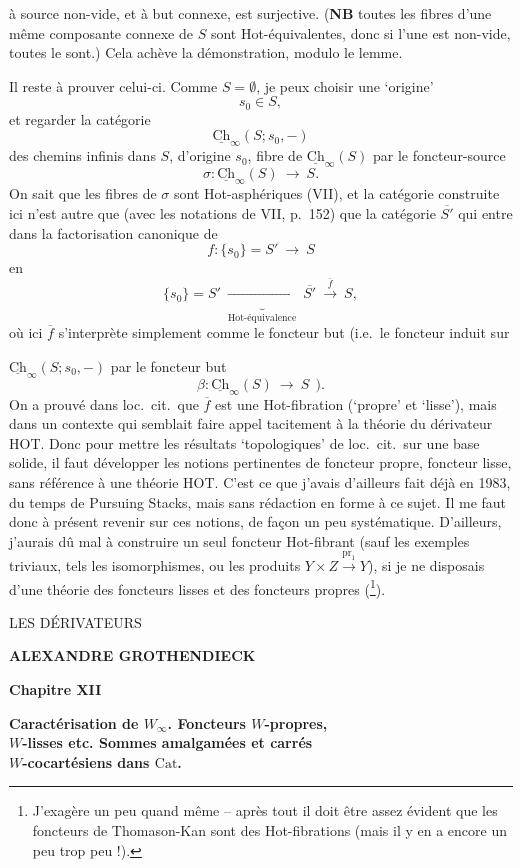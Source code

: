 \documentclass[11pt]{article}
\newcommand{\printedpage}[1]{\marginpar{\footnotesize p.~#1}}
\newcommand{\msp}[1]{\marginpar{\footnotesize [#1]}}
\newcommand{\Cat}{\mathrm{Cat}}
\newcommand{\Ch}{\underline{\mathrm{Ch}}}
\begin{document}
\msp{page 135}

à source non-vide, et à but connexe, est surjective. (\textbf{NB} toutes les fibres d'une même composante connexe de $S$ sont Hot-équivalentes, donc si l'une est non-vide, toutes le sont.) Cela achève la démonstration, modulo le lemme.

Il reste à prouver celui-ci. Comme $S = \emptyset$, je peux choisir une ‘origine’
\[
s_0 \in S,
\]
et regarder la catégorie
\[
\Ch_{\infty}(S; s_0, -)
\]
des chemins infinis dans $S$, d'origine $s_0$, fibre de $\Ch_{\infty}(S)$ par le foncteur-source
\[
\sigma : \Ch_{\infty}(S) \ \longrightarrow\ S.
\]
On sait que les fibres de $\sigma$ sont Hot-asphériques (VII), et la catégorie construite ici n'est autre que (avec les notations de VII, p.~152) que la catégorie $\overline{S'}$ qui entre dans la factorisation canonique de
\[
f : \{s_0\} = S' \ \longrightarrow\ S
\]
en
\[
\{s_0\} = S' \ \underbrace{\longrightarrow}_{\text{Hot-équivalence}}\ \overline{S'} \ \xrightarrow{\ \overline{f}\ }\ S,
\]
où ici $\overline{f}$ s'interprète simplement comme le foncteur but (i.e.\ le foncteur induit sur

\msp{page 136}

$\Ch_{\infty}(S; s_0, -)$ par le foncteur but
\[
\beta : \Ch_{\infty}(S) \ \longrightarrow\ S \ \ ).
\]
On a prouvé dans loc.\ cit.\ que $\overline{f}$ est une Hot-fibration (‘propre’ et ‘lisse’), mais dans un contexte qui semblait faire appel tacitement à la théorie du dérivateur HOT. Donc pour mettre les résultats ‘topologiques’ de loc.\ cit.\ sur une base solide, il faut développer les notions pertinentes de foncteur propre, foncteur lisse, sans référence à une théorie HOT. C'est ce que j'avais d'ailleurs fait déjà en 1983, du temps de Pursuing Stacks, mais sans rédaction en forme à ce sujet. Il me faut donc à présent revenir sur ces notions, de façon un peu systématique. D'ailleurs, j'aurais dû mal à construire un seul foncteur Hot-fibrant (sauf les exemples triviaux, tels les isomorphismes, ou les produits $Y \times Z \xrightarrow{\mathrm{pr}_1} Y$), si je ne disposais d'une théorie des foncteurs lisses et des foncteurs propres (\footnote{J'exagère un peu quand même -- après tout il doit être assez évident que les foncteurs de Thomason-Kan sont des Hot-fibrations (mais il y en a encore un peu trop peu !).}). %

\clearpage
\printedpage{--}

\begin{center}
\vspace*{5cm}
{\Large \textsf{LES DÉRIVATEURS}}

\bigskip

\textbf{ALEXANDRE GROTHENDIECK}

\bigskip\bigskip

\textbf{Chapitre XII}

\medskip

\textbf{Caractérisation de $W_\infty$. Foncteurs $W$-propres,\\
$W$-lisses etc. Sommes amalgamées et carrés\\
$W$-cocartésiens dans $\Cat$.}
\end{center}
\end{document}
